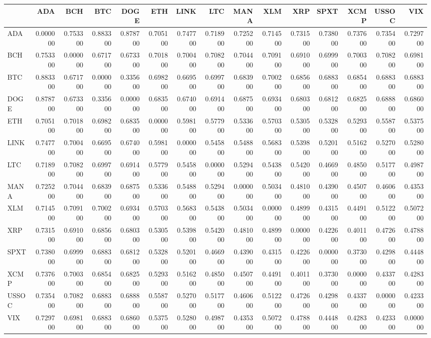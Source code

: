 \begin{tabular}{lrrrrrrrrrrrrrr}
\toprule
 & ADA & BCH & BTC & DOGE & ETH & LINK & LTC & MANA & XLM & XRP & SPXT & XCMP & USSOC & VIX \\
\midrule
ADA & 0.000000 & 0.753300 & 0.883300 & 0.878700 & 0.705100 & 0.747700 & 0.718900 & 0.725200 & 0.714500 & 0.731500 & 0.738000 & 0.737600 & 0.735400 & 0.729700 \\
BCH & 0.753300 & 0.000000 & 0.671700 & 0.673300 & 0.701800 & 0.700400 & 0.708200 & 0.704400 & 0.709100 & 0.691000 & 0.699900 & 0.700300 & 0.708200 & 0.698100 \\
BTC & 0.883300 & 0.671700 & 0.000000 & 0.335600 & 0.698200 & 0.669500 & 0.699700 & 0.683900 & 0.700200 & 0.685600 & 0.688300 & 0.685400 & 0.688300 & 0.688300 \\
DOGE & 0.878700 & 0.673300 & 0.335600 & 0.000000 & 0.683500 & 0.674000 & 0.691400 & 0.687500 & 0.693400 & 0.680300 & 0.681200 & 0.682500 & 0.688800 & 0.686000 \\
ETH & 0.705100 & 0.701800 & 0.698200 & 0.683500 & 0.000000 & 0.598100 & 0.577900 & 0.533600 & 0.570300 & 0.530500 & 0.532800 & 0.529300 & 0.558700 & 0.537500 \\
LINK & 0.747700 & 0.700400 & 0.669500 & 0.674000 & 0.598100 & 0.000000 & 0.545800 & 0.548800 & 0.568300 & 0.539800 & 0.520100 & 0.516200 & 0.527000 & 0.528000 \\
LTC & 0.718900 & 0.708200 & 0.699700 & 0.691400 & 0.577900 & 0.545800 & 0.000000 & 0.529400 & 0.543800 & 0.542000 & 0.466900 & 0.485000 & 0.517700 & 0.498700 \\
MANA & 0.725200 & 0.704400 & 0.683900 & 0.687500 & 0.533600 & 0.548800 & 0.529400 & 0.000000 & 0.503400 & 0.481000 & 0.439000 & 0.450700 & 0.460600 & 0.435300 \\
XLM & 0.714500 & 0.709100 & 0.700200 & 0.693400 & 0.570300 & 0.568300 & 0.543800 & 0.503400 & 0.000000 & 0.489900 & 0.431500 & 0.449100 & 0.512200 & 0.507200 \\
XRP & 0.731500 & 0.691000 & 0.685600 & 0.680300 & 0.530500 & 0.539800 & 0.542000 & 0.481000 & 0.489900 & 0.000000 & 0.422600 & 0.401100 & 0.472600 & 0.478800 \\
SPXT & 0.738000 & 0.699900 & 0.688300 & 0.681200 & 0.532800 & 0.520100 & 0.466900 & 0.439000 & 0.431500 & 0.422600 & 0.000000 & 0.373000 & 0.429800 & 0.444800 \\
XCMP & 0.737600 & 0.700300 & 0.685400 & 0.682500 & 0.529300 & 0.516200 & 0.485000 & 0.450700 & 0.449100 & 0.401100 & 0.373000 & 0.000000 & 0.433700 & 0.428300 \\
USSOC & 0.735400 & 0.708200 & 0.688300 & 0.688800 & 0.558700 & 0.527000 & 0.517700 & 0.460600 & 0.512200 & 0.472600 & 0.429800 & 0.433700 & 0.000000 & 0.423300 \\
VIX & 0.729700 & 0.698100 & 0.688300 & 0.686000 & 0.537500 & 0.528000 & 0.498700 & 0.435300 & 0.507200 & 0.478800 & 0.444800 & 0.428300 & 0.423300 & 0.000000 \\
\bottomrule
\end{tabular}
